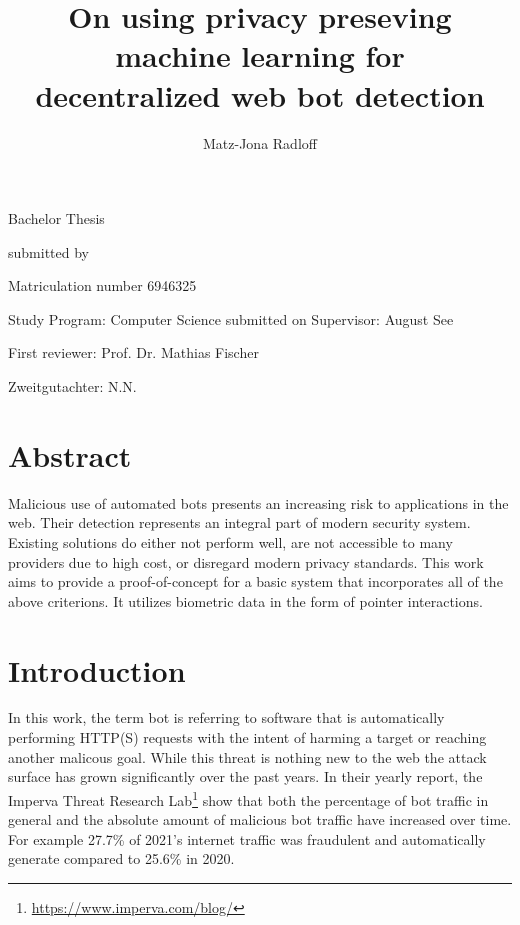 \documentclass[
    fontsize=12pt,
    headings=small,
    parskip=half,           %
    bibliography=totoc,
    numbers=noenddot,       %
    open=any,               %
    final                   %
]{scrreprt}
\begin{document}
\title{On using privacy preseving machine learning for\\decentralized web bot detection}
\author{Matz-Jona Radloff}


\begin{titlepage}
\begin{center}\Large
	\vfill
    Bachelor Thesis
	\vfill
	\makeatletter
	{\Large\textsf{\textbf{\@title}}\par}
	\makeatother
	\vfill
    submitted by
	\par\bigskip
	\makeatletter
	{\@author} \par
	\makeatother
	Matriculation number 6946325 \par
	Study Program: Computer Science
	\vfill
	\makeatletter
	submitted on {\@date}
	\makeatother
	\vfill
	Supervisor: August See\par
	First reviewer: Prof. Dr. Mathias Fischer \par
	Zweitgutachter: N.N.
\end{center}
\end{titlepage}


\chapter*{Abstract}

Malicious use of automated bots presents an increasing risk to applications in the web. Their detection represents an integral part of modern security system. Existing solutions do either not perform well, are not accessible to many providers due to high cost, or disregard modern privacy standards. This work aims to provide a proof-of-concept for a basic system that incorporates all of the above criterions. It utilizes biometric data in the form of pointer interactions.

\tableofcontents

\chapter{Introduction}

In this work, the term bot is referring to software that is automatically performing HTTP(S) requests with the intent of harming a target or reaching another malicous goal. While this threat is nothing new to the web the attack surface has grown significantly over the past years. In their yearly report, the Imperva Threat Research Lab\footnote{\url{https://www.imperva.com/blog/}} show that both the percentage of bot traffic in general and the absolute amount of malicious bot traffic have increased over time.\cite{BAD_BOT_REPORT2020,BAD_BOT_REPORT2021,BAD_BOT_REPORT2022} For example 27.7\% of 2021's internet traffic was fraudulent and automatically generate compared to 25.6\% in 2020.
\end{document}
